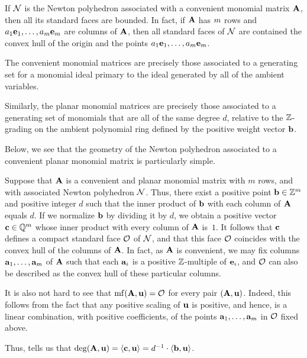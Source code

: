 \documentclass{amsart}
\begin{document}
\begin{remark}
   If $\mathcal{N}$ is the Newton polyhedron associated with a convenient monomial matrix $\mathbf{A}$, then all its standard faces are bounded.
   In fact, if $\mathbf{A}$ has $m$ rows and $a_1\mathbf{e}_1, \ldots, a_m \mathbf{e}_{m}$ are columns of $\mathbf{A}$, then all standard faces of $\mathcal{N}$ are contained the convex hull of the origin and the points $a_1\mathbf{e}_1, \ldots, a_m \mathbf{e}_{m}$.
\end{remark}

\begin{remark} The convenient monomial matrices are precisely those associated to a generating set for a monomial ideal primary to the ideal generated by all of the ambient variables.  

Similarly, the planar monomial matrices are precisely those associated to a generating set of monomials that are all of the same degree $d$, relative to the $\mathbb{Z}$-grading on the ambient polynomial ring defined by the positive weight vector $\mathbf{b}$.
\end{remark}

Below, we see that the  geometry of the Newton polyhedron associated to a convenient planar monomial matrix is particularly simple.

\begin{example}
   \label{ex: convenient planar case}   
Suppose that $\mathbf{A}$ is a convenient and planar monomial matrix with $m$ rows, and with associated Newton polyhedron $\mathcal{N}$.     
Thus, there exist a positive point $\mathbf{b} \in \mathbb{Z}^m$ and positive integer $d$ such that the inner product of $\mathbf{b}$ with each column of $\mathbf{A}$ equals $d$.  If we normalize  $\mathbf{b}$ by dividing it by $d$, we obtain a positive vector $\mathbf{c} \in \mathbb{Q}^m$ whose inner product with every column of $\mathbf{A}$ is~$1$.  It follows that $\mathbf{c}$ defines a compact standard face $\mathcal{O}$ of $\mathcal{N}$, and that this face $\mathcal{O}$ coincides with the convex hull of the columns of $\mathbf{A}$.
In fact, as $\mathbf{A}$ is convenient, we may fix columns $\mathbf{a}_1, \ldots, \mathbf{a}_m$ of $\mathbf{A}$ such that each $\mathbf{a}_i$ is a positive $\mathbb{Z}$-multiple of $\mathbf{e}_i$, and $\mathcal{O}$ can also be described as the convex hull of these particular columns.   
   
It is also not hard to see that $\operatorname{mf}(\mathbf{A}, \mathbf{u}) = \mathcal{O}$ for every pair $(\mathbf{A}, \mathbf{u})$.  Indeed, this follows from the fact that any positive scaling of $\mathbf{u}$ is positive, and hence, is a linear combination, with positive coefficients,  of the points $\mathbf{a}_1, \ldots, \mathbf{a}_m$ in $\mathcal{O}$ fixed above. 

Thus,  tells us that $\deg(\mathbf{A}, \mathbf{u}) = \langle \mathbf{c}, \mathbf{u} \rangle = d^{-1} \cdot \langle \mathbf{b}, \mathbf{u} \rangle$.
\end{example}
\end{document}
